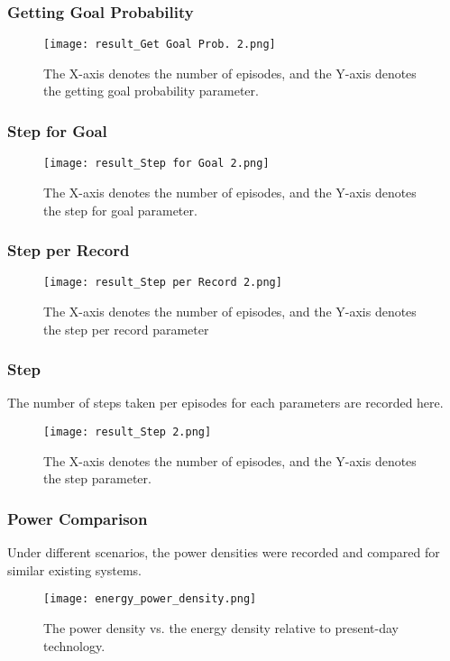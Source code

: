 \documentclass[preprint,12pt]{elsarticle}
\begin{document}
\subsubsection{Getting Goal Probability}
\begin{figure}[!htbp]
  \centering
  \texttt{[image: result\_Get Goal Prob. 2.png]}
  \caption{The X-axis denotes the number of episodes, and the Y-axis denotes the getting goal probability parameter.}
  \label{fig:getting-goal-probability}
\end{figure}

\subsubsection{Step for Goal}
\begin{figure}[!htbp]
  \centering
  \texttt{[image: result\_Step for Goal 2.png]}
  \caption{The X-axis denotes the number of episodes, and the Y-axis denotes the step for goal parameter.}
  \label{fig:step-for-goal}
\end{figure}

\subsubsection{Step per Record}
\begin{figure}[!htbp]
  \centering
  \texttt{[image: result\_Step per Record 2.png]}
  \caption{The X-axis denotes the number of episodes, and the Y-axis denotes the step per record parameter}
  \label{fig:step-per-record}
\end{figure}

\subsubsection{Step}
The number of steps taken per episodes for each parameters are recorded here.
\begin{figure}[!htbp]
  \centering
  \texttt{[image: result\_Step 2.png]}
  \caption{The X-axis denotes the number of episodes, and the Y-axis denotes the step parameter.}
  \label{fig:step}
\end{figure}

\subsubsection{Power Comparison}
Under different scenarios, the power densities were recorded and compared for similar existing systems.
\begin{figure}[!htbp]
  \centering
  \texttt{[image: energy\_power\_density.png]}
  \caption{The power density vs. the energy density relative to present-day technology.}
  \label{fig:power-comparison}
\end{figure}
\end{document}
